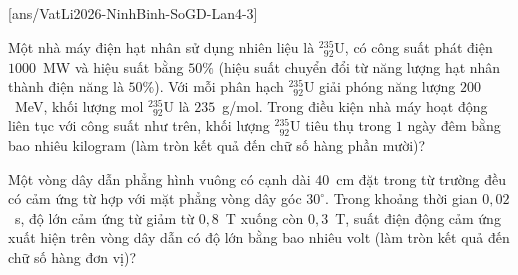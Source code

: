 	\subsection*{}
	\setcounter{ex}{0}
	[ans/VatLi2026-NinhBinh-SoGD-Lan4-3]

	\begin{ex}%
		Một nhà máy điện hạt nhân sử dụng nhiên liệu là ${}^{235}_{\phantom{2}92}\text{U}$, có công suất phát điện $1000$~MW và hiệu suất bằng $50\%$ (hiệu suất chuyển đổi từ năng lượng hạt nhân thành điện năng là $50\%$). Với mỗi phân hạch ${}^{235}_{\phantom{2}92}\text{U}$ giải phóng năng lượng $200$~MeV, khối lượng mol ${}^{235}_{\phantom{2}92}\text{U}$ là $235$~g/mol. Trong điều kiện nhà máy hoạt động liên tục với công suất như trên, khối lượng ${}^{235}_{\phantom{2}92}\text{U}$ tiêu thụ trong $1$ ngày đêm bằng bao nhiêu kilogram (làm tròn kết quả đến chữ số hàng phần mười)?
		\par
	\end{ex}

	\begin{ex}%
		Một vòng dây dẫn phẳng hình vuông có cạnh dài $40$~cm đặt trong từ trường đều có cảm ứng từ hợp với mặt phẳng vòng dây góc $30^\circ$. Trong khoảng thời gian $0{,}02$~s, độ lớn cảm ứng từ giảm từ $0{,}8$~T xuống còn $0{,}3$~T, suất điện động cảm ứng xuất hiện trên vòng dây dẫn có độ lớn bằng bao nhiêu volt (làm tròn kết quả đến chữ số hàng đơn vị)?
		\par
	\end{ex}

